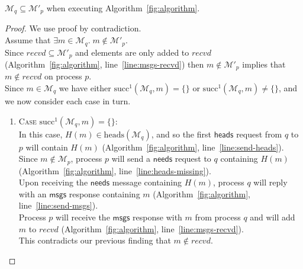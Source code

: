 \documentclass[a4paper,anonymous,USenglish]{lipics-v2019}
\begin{document}
\begin{lemma}\label{lemma:no-q-missing}
$\mathcal{M}_q \subseteq \mathcal{M}'_p$ when executing Algorithm~\ref{fig:algorithm}.
\end{lemma}
\begin{proof}
We use proof by contradiction.\\
Assume that $\exists m \in \mathcal{M}_q.\; m \notin  \mathcal{M}'_p$.\\
Since $\mathit{recvd} \subseteq \mathcal{M}'_p$ and elements are only added to $\mathit{recvd}$ (Algorithm~\ref{fig:algorithm}, line~\ref{line:msgs-recvd}) then $m \notin  \mathcal{M}'_p$ implies that $m \notin \mathit{recvd}$ on process $p$.\\
Since $m \in \mathcal{M}_q$ we have either $\mathrm{succ}^1(\mathcal{M}_q, m) = \{\}$ or $\mathrm{succ}^1(\mathcal{M}_q, m) \ne \{\}$, and we now consider each case in turn.
\begin{enumerate}
    \item\textsc{Case} $\mathrm{succ}^1(\mathcal{M}_q, m) = \{\}$:\\
    In this case, $H(m) \in \mathrm{heads}(\mathcal{M}_q)$, and so the first $\mathsf{heads}$ request from $q$ to $p$ will contain $H(m)$ (Algorithm~\ref{fig:algorithm}, line~\ref{line:send-heads}).\\
    Since $m \notin \mathcal{M}_p$, process $p$ will send a $\mathsf{needs}$ request to $q$ containing $H(m)$ (Algorithm~\ref{fig:algorithm}, line~\ref{line:heads-missing}).\\
    Upon receiving the $\mathsf{needs}$ message containing $H(m)$, process $q$ will reply with an $\mathsf{msgs}$ response containing $m$ (Algorithm~\ref{fig:algorithm}, line~\ref{line:send-msgs}).\\
    Process $p$ will receive the $\mathsf{msgs}$ response with $m$ from process $q$ and will add $m$ to $\mathit{recvd}$ (Algorithm~\ref{fig:algorithm}, line~\ref{line:msgs-recvd}).\\
    This contradicts our previous finding that $m \notin \mathit{recvd}$.
    

\end{enumerate}
\end{proof}
\end{document}
